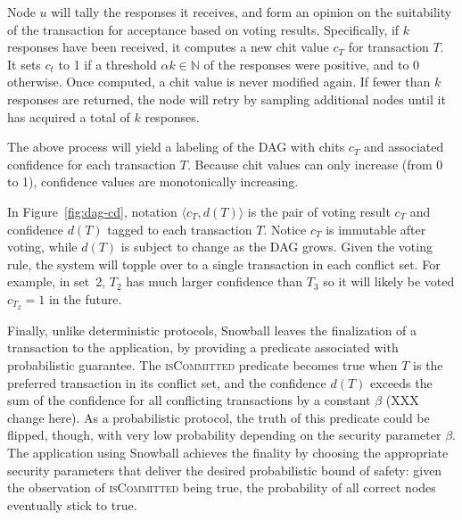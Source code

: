 Node $u$ will tally the responses it receives, and form an opinion on the suitability of the transaction for acceptance based on voting results.
Specifically, if $k$ responses have been received, it computes a new chit value $c_T$ for transaction $T$.
It sets $c_t$ to 1 if a threshold $\alpha k \in \mathbb{N}$ of the responses were positive, and to 0 otherwise.  Once computed, a chit value is never modified again.
If fewer than $k$ responses are returned, the node will retry by sampling additional nodes until it has acquired a total of $k$ responses.

The above process will yield a labeling of the DAG with chits $c_T$ and associated confidence for each transaction $T$.
Because chit values can only increase (from 0 to 1),
confidence values are monotonically increasing.

\begin{center}
    
    \label{fig:dag-cd}
\end{center}

In Figure~\ref{fig:dag-cd}, notation $\langle c_T, d(T)\rangle$ is the pair of voting result
$c_T$ and confidence $d(T)$ tagged to each transaction $T$.  Notice $c_T$ is
immutable after voting, while $d(T)$ is subject to change as the DAG grows.
Given the
voting rule, the system will topple over to a single transaction in each
conflict set.  For example, in set~2, $T_2$ has much larger confidence than
$T_3$ so it will likely be voted $c_{T_2} = 1$ in the future.


Finally, unlike deterministic protocols, Snowball leaves the finalization of a
transaction to the application, by providing a predicate associated with
probabilistic guarantee.  The \textsc{isCommitted} predicate becomes true when $T$ is the
preferred transaction in its conflict set, and the confidence $d(T)$ exceeds
the sum of the confidence for all conflicting transactions by a constant
$\beta$ (XXX change here). As a probabilistic protocol, the truth of this predicate could be flipped, though,
with very low probability depending on the security parameter $\beta$. The
application using Snowball achieves the finality by choosing the appropriate
security parameters that deliver the desired probabilistic bound of safety:
given the observation of \textsc{isCommitted} being true, the
probability of all correct nodes eventually stick to true.

